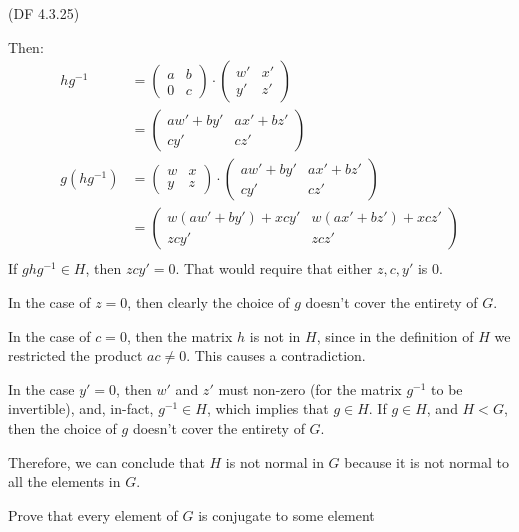 \begin{problem}{(\textsf{DF 4.3.25})}
\begin{enumalph}
\begin{Answer}
      \noindent
      Then:
      \begin{align*}
        hg^{-1} &= \begin{pmatrix} a & b \\ 0 & c \end{pmatrix} \cdot \begin{pmatrix} w' & x' \\ y' & z' \end{pmatrix} \\
        &= \begin{pmatrix} aw' + by' & ax' + bz' \\ cy' & cz' \end{pmatrix} \\
        g(hg^{-1}) &= \begin{pmatrix} w & x \\ y & z \end{pmatrix} \cdot \begin{pmatrix} aw' + by' & ax' + bz' \\ cy' & cz' \end{pmatrix} \\
        &= \begin{pmatrix} w(aw' + by') + xcy' & w(ax' + bz') + xcz' \\ zcy' & zcz' \end{pmatrix} \\
      \end{align*}
      If $ghg^{-1} \in H$, then $zcy' = 0$.
      That would require that either $z, c, y'$ is $0$.
      \begin{enumalph}
        \item In the case of $z = 0$, then clearly the choice of $g$ doesn't cover the entirety of $G$.
        \item In the case of $c = 0$, then the matrix $h$ is not in $H$, since in the definition
          of $H$ we restricted the product $ac \neq 0$. This causes a contradiction.
        \item In the case $y' = 0$, then $w'$ and $z'$ must non-zero (for the matrix $g^{-1}$ to be
          invertible), and, in-fact, $g^{-1} \in H$, which implies that $g \in H$.
          If $g \in H$, and $H < G$, then the choice of $g$ doesn't cover the entirety of $G$.
      \end{enumalph}
      Therefore, we can conclude that $H$ is not normal in $G$ because it is not normal
      to all the elements in $G$.
    \end{Answer}
    \item Prove that every element of $G$ is conjugate to some element

\end{enumalph}
\end{problem}
